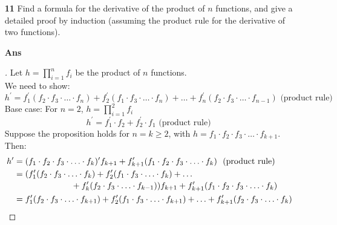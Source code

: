 \documentclass[paper=usletter, fontsize=12pt]{article}
\begin{document}
\begin{itemize}
\begin{itemize}
            \item[\textbf{11}] Find a formula for the derivative of the product
            of $n$ functions, and give a detailed proof by induction (assuming
            the product rule for the derivative of two functions).
            \item[\textbf{Ans}]
            \begin{proof}[\unskip\nopunct]
                Let $h = \prod_{i=1}^{n} f_i$ be the product of $n$ functions.
                \\ We need to show:
                \begin{equation*}
                    h^\prime = f_1^\prime(f_2 \cdot f_3 \cdot \ldots \cdot f_n)
                    + f_2^\prime(f_1 \cdot f_3 \cdot \ldots \cdot f_n) + \ldots
                    + f_n^\prime(f_2 \cdot f_3 \cdot \ldots \cdot f_{n-1})
                      \text{ \ (product rule) \ }
                \end{equation*}
                Base case: For $n = 2$, $h = \prod_{i=1}^{2} f_i$
                \begin{equation*}
                    h^\prime = f_1^\prime \cdot f_2 + f_2^\prime \cdot f_1
                    \text{ \ (product rule) \ }
                \end{equation*}
                Suppose the proposition holds for $n = k \ge 2$, with $h = f_1
                \cdot f_2 \cdot f_3 \cdot \ldots \cdot f_{k+1}$. Then:
                \begin{align*}
                    h^\prime & = (f_1 \cdot f_2 \cdot f_3 \cdot \ldots \cdot
                    f_{k})^\prime f_{k+1} + f_{k+1}^\prime(f_1 \cdot f_2 \cdot
                    f_3 \cdot \ldots \cdot f_{k}) \text{ \ (product rule) \ }
                    \\
                    & = \!\begin{multlined}[t][10.5cm]
                        (f_1^\prime(f_2 \cdot f_3 \cdot \ldots \cdot f_k) +
                        f_2^\prime(f_1 \cdot f_3 \cdot \ldots \cdot f_k) +
                        \ldots \\ + f_k^\prime(f_2 \cdot f_3 \cdot \ldots \cdot
                        f_{k-1})) f_{k+1} + f_{k+1}^\prime(f_1 \cdot f_2 \cdot
                        f_3 \cdot \ldots \cdot f_{k})
                    \end{multlined} \\
                    & = f_1^\prime(f_2 \cdot f_3 \cdot \ldots \cdot f_{k+1})
                    + f_2^\prime(f_1 \cdot f_3 \cdot \ldots \cdot f_{k+1}) +
                      \ldots + f_{k+1}^\prime(f_2 \cdot f_3 \cdot \ldots \cdot
                      f_{k}) \qedhere
                \end{align*}
            \end{proof}
            \vspace{0.2in}


\end{itemize}
\end{itemize}
\end{document}
